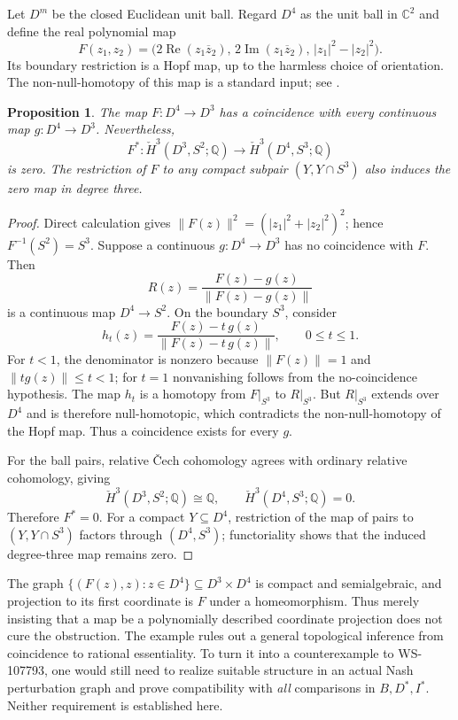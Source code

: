 \documentclass[11pt]{article}
\newtheorem{proposition}[theorem]{Proposition}
\theoremstyle{definition}
\newcommand{\Q}{\mathbb Q}
\begin{document}
Let $D^m$ be the closed Euclidean unit ball. Regard $D^4$ as the unit ball
in $\mathbb C^2$ and define the real polynomial map
\begin{equation}\label{eq:hopf}
 F(z_1,z_2)=\bigl(2\operatorname{Re}(z_1\overline z_2),\,
 2\operatorname{Im}(z_1\overline z_2),\,|z_1|^2-|z_2|^2\bigr).
\end{equation}
Its boundary restriction is a Hopf map, up to the harmless choice of
orientation. The non-null-homotopy of this map is a standard input;
see \cite[Example 4.51, p.~380; Section 4.B, p.~427]{hatcher}.

\begin{proposition}\label{prop:hopf}
The map $F:D^4\to D^3$ has a coincidence with every continuous map
$g:D^4\to D^3$. Nevertheless,
\[
 F^*:\check H^3(D^3,S^2;\Q)\longrightarrow
           \check H^3(D^4,S^3;\Q)
\]
is zero. The restriction of $F$ to any compact subpair
$(Y,Y\cap S^3)$ also induces the zero map in degree three.
\end{proposition}
\begin{proof}
Direct calculation gives
$\|F(z)\|^2=(|z_1|^2+|z_2|^2)^2$; hence
$F^{-1}(S^2)=S^3$. Suppose a continuous $g:D^4\to D^3$ has no
coincidence with $F$. Then
\[
 R(z)=\frac{F(z)-g(z)}{\|F(z)-g(z)\|}
\]
is a continuous map $D^4\to S^2$. On the boundary $S^3$, consider
\[
 h_t(z)=\frac{F(z)-t\,g(z)}{\|F(z)-t\,g(z)\|},\qquad 0\le t\le1.
\]
For $t<1$, the denominator is nonzero because $\|F(z)\|=1$ and
$\|t g(z)\|\le t<1$; for $t=1$ nonvanishing follows from the
no-coincidence hypothesis. The map $h_t$ is a homotopy from
$F|_{S^3}$ to $R|_{S^3}$. But $R|_{S^3}$ extends over $D^4$ and is
therefore null-homotopic, which contradicts the non-null-homotopy of
the Hopf map. Thus a coincidence exists for every $g$.

For the ball pairs, relative \v Cech cohomology agrees with ordinary
relative cohomology, giving
\[
 \check H^3(D^3,S^2;\Q)\cong\Q,\qquad
 \check H^3(D^4,S^3;\Q)=0.
\]
Therefore $F^*=0$. For a compact $Y\subseteq D^4$, restriction of the
map of pairs to $(Y,Y\cap S^3)$ factors through $(D^4,S^3)$;
functoriality shows that the induced degree-three map remains zero.
\end{proof}

The graph
$\{(F(z),z):z\in D^4\}\subseteq D^3\times D^4$ is compact and semialgebraic,
and projection to its first coordinate is $F$ under a homeomorphism.
Thus merely insisting that a map be a polynomially described coordinate
projection does not cure the obstruction.
The example rules out a general topological inference from coincidence to
rational essentiality. To turn it into a counterexample to WS-107793, one would
still need to realize suitable structure in an actual Nash perturbation
graph and prove compatibility with \emph{all} comparisons in $B,D^*,I^*$.
Neither requirement is established here.
\end{document}
